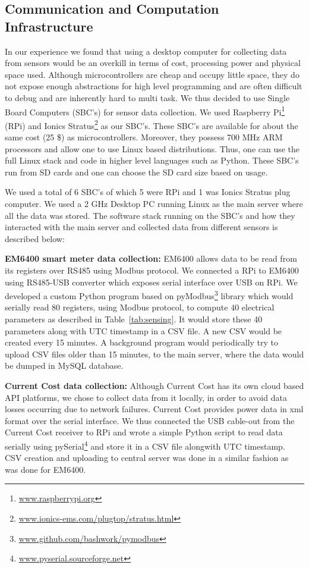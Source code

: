 \documentclass[10pt]{sensys-proc}
\newcommand{\tabref}[1]{Table~\ref{#1}}
\begin{document}
\subsection{Communication and Computation Infrastructure}
In our experience we found that using a desktop computer for collecting data from sensors would be an overkill in terms of cost, processing power and physical space used. Although microcontrollers are cheap and occupy little space, they do not expose enough abstractions for high level programming and are often difficult to debug and are inherently hard to multi task. We thus decided to use Single Board Computers (SBC's) for sensor data collection. We used Raspberry Pi\footnote{\url{www.raspberrypi.org}} (RPi) and Ionics Stratus\footnote{\url{www.ionics-ems.com/plugtop/stratus.html}} as our SBC's. These SBC's are available for about the same cost (25 \$) as microcontrollers. Moreover, they possess 700 MHz ARM processors and allow one to use Linux based distributions. Thus, one can use the full Linux stack and code in higher level languages such as Python. These SBC's run from SD cards and one can choose the SD card size based on usage. 

We used a total of 6 SBC's of which 5 were RPi and 1 was Ionics Stratus plug computer. We used a 2 GHz Desktop PC running Linux as the main server where all the data was stored. The software stack running on the SBC's and how they interacted with the main server and collected data from different sensors is described below:

\noindent \textbf{EM6400 smart meter data collection:} EM6400 allows data to be read from its registers over RS485 using Modbus protocol. We connected a RPi to EM6400 using RS485-USB converter which exposes serial interface over USB on RPi. We developed a custom Python program based on pyModbus\footnote{\url{www.github.com/bashwork/pymodbus}} library which would serially read 80 registers, using Modbus protocol, to compute 40 electrical parameters as described in \tabref{tab:sensing}. It would store these 40 parameters along with UTC timestamp in a CSV file. A new CSV would be created every 15 minutes. A background program would periodically try to upload CSV files older than 15 minutes, to the main server, where the data would be dumped in MySQL database.

\noindent \textbf{Current Cost data collection:} Although Current Cost has its own cloud based API platforms, we chose to collect data from it locally, in order to avoid data losses occurring due to network failures. Current Cost provides power data in xml format over the serial interface. We thus connected the USB cable-out from the Current Cost receiver to RPi and wrote a simple Python script to read data serially using pySerial\footnote{\url{www.pyserial.sourceforge.net}} and store it in a CSV file alongwith UTC timestamp. CSV creation and uploading to central server was done in a similar fashion as was done for EM6400.
\end{document}
